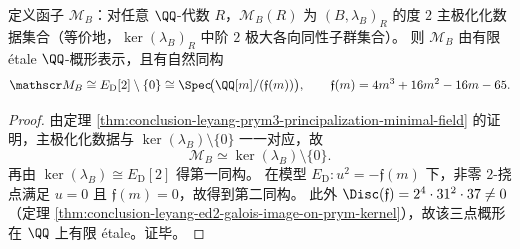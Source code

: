 \begin{proposition}\label{prop:conclusion-leyang-prym3-principalization-moduli-threepoint-etale}
定义函子 \(\mathscr M_B\)：对任意 \(\QQ\)-代数 \(R\)，\(\mathscr M_B(R)\) 为 \((B,\lambda_B)_R\) 的度 \(2\) 主极化化数据集合（等价地，\(\ker(\lambda_B)_R\) 中阶 \(2\) 极大各向同性子群集合）。
则 \(\mathscr M_B\) 由有限 \'{e}tale \(\QQ\)-概形表示，且有自然同构
\[
\mathscr M_B\cong E_{\mathrm D}[2]\setminus\{0\}
\cong \Spec\!\bigl(\QQ[m]/(\mathfrak f(m))\bigr),
\qquad
\mathfrak f(m)=4m^3+16m^2-16m-65.
\]
\end{proposition}
\begin{proof}
由定理 \ref{thm:conclusion-leyang-prym3-principalization-minimal-field} 的证明，主极化化数据与 \(\ker(\lambda_B)\setminus\{0\}\) 一一对应，故
\[
\mathscr M_B\simeq \ker(\lambda_B)\setminus\{0\}.
\]
再由 \(\ker(\lambda_B)\cong E_{\mathrm D}[2]\) 得第一同构。
在模型 \(E_{\mathrm D}:u^2=-\mathfrak f(m)\) 下，非零 \(2\)-挠点满足 \(u=0\) 且 \(\mathfrak f(m)=0\)，故得到第二同构。
此外 \(\Disc(\mathfrak f)=2^4\cdot 31^2\cdot 37\neq 0\)（定理 \ref{thm:conclusion-leyang-ed2-galois-image-on-prym-kernel}），故该三点概形在 \(\QQ\) 上有限 \'{e}tale。证毕。
\end{proof}


